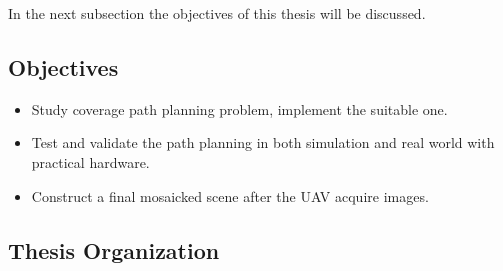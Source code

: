 
In the next subsection the objectives of this thesis will be discussed.

\subsection{Objectives}
\begin{itemize}

\item Study coverage path planning problem, implement the suitable one.
\item Test and validate the path planning in both simulation and real world with practical hardware.
\item Construct a final mosaicked scene after the UAV acquire images.

\end{itemize}

\subsection{Thesis Organization}
